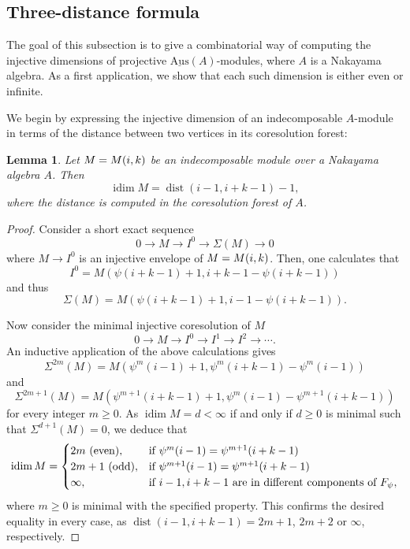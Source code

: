 \documentclass[a4paper]{amsart}
\newtheorem{lemma}[theorem]{Lemma}
\theoremstyle{definition}
\theoremstyle{remark}
\numberwithin{equation}{theorem}
\newcommand{\sAus}{\operatorname{\underline{Aus}}}
\newcommand{\idim}{\operatorname{idim}}
\newcommand{\dist}{\operatorname{dist}}
\newcommand{\psiforest}{F_\psi}
\begin{document}
\subsection{Three-distance formula}\label{subsec:three-distance}

The goal of this subsection is to give a combinatorial way of computing the injective dimensions of projective $ \sAus(A) $-modules, where $ A $ is a Nakayama algebra. As a first application, we show that each such dimension is either even or infinite.

We begin by expressing the injective dimension of an indecomposable $ A $-module in terms of the distance between two vertices in its coresolution forest:

\begin{lemma}\label{lemma:distances}
  Let $M = \mik$ be an indecomposable module over a Nakayama algebra $ A $. Then
  \[
    \idim M = \dist(i - 1, i + k - 1) - 1,
  \]
  where the distance is computed in the coresolution forest of $ A $.
\end{lemma}

\begin{proof}
    Consider a short exact sequence
        \[
            0 \to M \to I^0 \to \Sigma (M) \to 0
        \]
    where $ M \to I^0 $ is an injective envelope of $ M = \mik $. Then, one calculates that
        \[
            I^0 = M ( \psi(i+k-1)+1 , i+k-1 - \psi(i+k-1) )
        \]
    and thus
        \[
            \Sigma (M) = M ( \psi(i+k-1)+1 , i-1 - \psi(i+k-1) ) .
        \]

    Now consider the minimal injective coresolution of $M$
    \[
    0 \rightarrow M \rightarrow I^0 \rightarrow I^1 \rightarrow I^2 \rightarrow \cdots  .
    \]
    An inductive application of the above calculations gives
        \[
            \Sigma^{ 2m } (M) = M( \psi^m(i-1)+1 , \psi^m(i+k-1)-\psi^m(i-1) )
        \]
    and
        \[
            \Sigma^{ 2m+1 } (M) = M( \psi^{m+1}(i+k-1)+1 , \psi^m(i-1)-\psi^{m+1}(i+k-1) )
        \]
    for every integer $ m \geq 0 $. As $ \idim M = d < \infty $ if and only if $ d \geq 0 $ is minimal such that $ \Sigma^{d+1} (M) =0$, we deduce that
        \[
            \idim M =
                \begin{cases}
                  2m \textrm{ (even)}, & \text{if } \psi^m(i-1) = \psi^{m+1}(i+k-1) \\
                  2m+1 \textrm{ (odd)},  & \text{if } \psi^{m+1}(i-1) = \psi^{m+1}(i+k-1) \\
                  \infty,  & \text{if } i-1, i+k-1 \textrm{ are in different components of $ \psiforest$},
                \end{cases}
        \]
    where $ m \geq 0 $ is minimal with the specified property. This confirms the desired equality in every case, as $ \dist(i-1,i+k-1) = 2m+1 $, $ 2m+2 $ or $ \infty $, respectively.
\end{proof}
\end{document}
